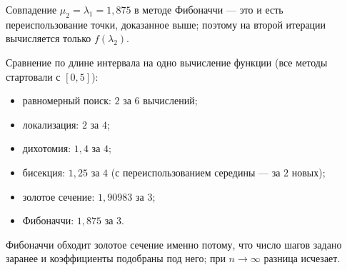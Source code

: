 \begin{idea}
Совпадение $\mu_2 = \lambda_1 = 1{,}875$ в методе Фибоначчи — это и есть
переиспользование точки, доказанное выше; поэтому на второй итерации
вычисляется только $f(\lambda_2)$.

Сравнение по длине интервала на одно вычисление функции (все методы стартовали
с $[0,5]$):
\begin{itemize}[nosep,left=0pt]
  \item равномерный поиск: $2$ за $6$ вычислений;
  \item локализация: $2$ за $4$;
  \item дихотомия: $1{,}4$ за $4$;
  \item бисекция: $1{,}25$ за $4$ (с переиспользованием середины — за $2$ новых);
  \item золотое сечение: $1{,}90983$ за $3$;
  \item Фибоначчи: $1{,}875$ за $3$.
\end{itemize}
Фибоначчи обходит золотое сечение именно потому, что число шагов задано
заранее и коэффициенты подобраны под него; при $n \to \infty$ разница исчезает.
\end{idea}
